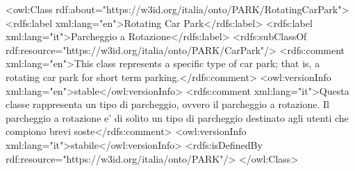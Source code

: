 <owl:Class rdf:about="https://w3id.org/italia/onto/PARK/RotatingCarPark">
    <rdfs:label xml:lang="en">Rotating Car Park</rdfs:label>
    <rdfs:label xml:lang="it">Parcheggio a Rotazione</rdfs:label>
    <rdfs:subClassOf rdf:resource="https://w3id.org/italia/onto/PARK/CarPark"/>
    <rdfs:comment xml:lang="en">This class represents a specific type of car park; that is, a rotating car park for short term parking.</rdfs:comment>
    <owl:versionInfo xml:lang="en">stable</owl:versionInfo>
    <rdfs:comment xml:lang="it">Questa classe rappresenta un tipo di parcheggio, ovvero il parcheggio a rotazione. Il parcheggio a rotazione e' di solito un tipo di parcheggio destinato agli utenti che compiono brevi soste</rdfs:comment>
    <owl:versionInfo xml:lang="it">stabile</owl:versionInfo>
    <rdfs:isDefinedBy rdf:resource="https://w3id.org/italia/onto/PARK"/>
</owl:Class>